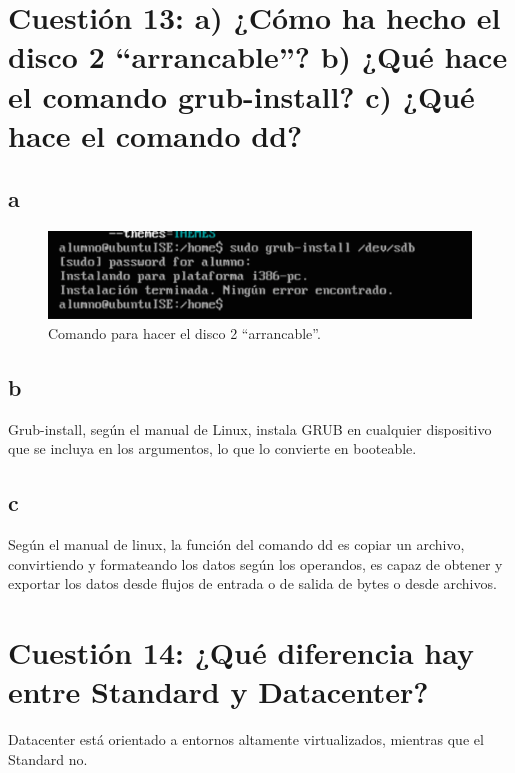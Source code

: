 \section{Cuestión 13: a) ¿Cómo ha hecho el disco 2 “arrancable”? b) ¿Qué hace el comando grub-install? c) ¿Qué hace el comando dd?}
\subsection{a}
\begin{figure}[H]
\centering
\includegraphics{grubinstall}
\caption{Comando para hacer el disco 2 “arrancable”.}
\end{figure}
\subsection{b}
Grub-install, según el manual de Linux, instala GRUB en cualquier dispositivo que se incluya en los argumentos, lo que lo convierte en booteable.
\subsection{c}
Según el manual de linux, la función del comando dd es copiar un archivo, convirtiendo y formateando los datos según los operandos, es capaz de obtener y exportar los datos desde flujos de entrada o de salida de bytes o desde archivos.

\section{Cuestión 14: ¿Qué diferencia hay entre Standard y Datacenter?}
Datacenter está orientado a entornos altamente virtualizados, mientras que el Standard no. \cite{24}

